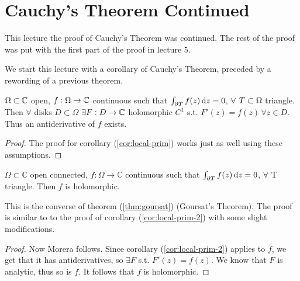 \setcounter{section}{0}
\setcounter{theorem}{0}



\section{Cauchy's Theorem Continued}

This lecture the proof of Cauchy's Theorem was continued. The rest of the proof was put with the first part of the proof in lecture 5.

We start this lecture with a corollary of Cauchy's Theorem, preceded by a rewording of a previous theorem.


\begin{corollary}\label{cor:local-prim-2}
$ \Omega \subset \mathbb{C} $ open, $f:\Omega \rightarrow \mathbb{C}$ continuous such that $\int_{\partial T} f(z) \dif z = 0$, $ \forall$ $T \subset \Omega$ triangle. Then $\forall$ disks $D\subset \Omega$ $\exists F:D\rightarrow \mathbb{C}$ holomorphic $C^1$ s.t. $F'(z)=f(z) \, \forall z\in D$. Thus an antiderivative of $f$ exists.
\end{corollary}

\begin{proof}
The proof for corollary (\ref{cor:local-prim}) works just as well using these assumptions.
\end{proof}


\begin{corollary}\label{cor:morera}
$\Omega \subset \mathbb{C}$ open connected, $f:\Omega \rightarrow \mathbb{C}$ continuous such that $\int_{\partial T} f(z) \dif z = 0$, $ \forall$ T triangle. Then $f$ is holomorphic.
\end{corollary}

\begin{note}
This is the converse of theorem (\ref{thm:goursat}) (Goursat's Theorem). The proof is similar to to the proof of corollary (\ref{cor:local-prim-2}) with some slight modifications.
\end{note}






\begin{proof} Now Morera follows. Since corollary (\ref{cor:local-prim-2}) applies to $f$, we get that it has antiderivatives, so $\exists F$ s.t. $F'(z)=f(z)$. We know that $F$ is analytic, thus so is $f$. It follows that $f$ is holomorphic.

\end{proof}





